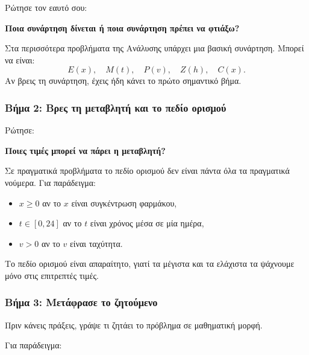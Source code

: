 Ρώτησε τον εαυτό σου:
\begin{center}
\textbf{Ποια συνάρτηση δίνεται ή ποια συνάρτηση πρέπει να φτιάξω?}
\end{center}
Στα περισσότερα προβλήματα της Ανάλυσης υπάρχει μια βασική συνάρτηση. Μπορεί να είναι:
\[
E(x),\quad M(t),\quad P(v),\quad Z(h),\quad C(x).
\]
Αν βρεις τη συνάρτηση, έχεις ήδη κάνει το πρώτο σημαντικό βήμα.

\subsubsection*{Βήμα 2: Βρες τη μεταβλητή και το πεδίο ορισμού}
Ρώτησε:
\begin{center}
\textbf{Ποιες τιμές μπορεί να πάρει η μεταβλητή?}
\end{center}
Σε πραγματικά προβλήματα το πεδίο ορισμού δεν είναι πάντα όλα τα πραγματικά νούμερα. Για παράδειγμα:
\begin{itemize}
\item $x\geq 0$ αν το \(x\) είναι συγκέντρωση φαρμάκου,
\item $t\in[0,24]$ αν το \(t\) είναι χρόνος μέσα σε μία ημέρα,
\item $v>0$ αν το \(v\) είναι ταχύτητα.
\end{itemize}

Το πεδίο ορισμού είναι απαραίτητο, γιατί τα μέγιστα και τα ελάχιστα τα ψάχνουμε μόνο στις επιτρεπτές τιμές.

\subsubsection*{Βήμα 3: Μετάφρασε το ζητούμενο}

Πριν κάνεις πράξεις, γράψε τι ζητάει το πρόβλημα σε μαθηματική μορφή.

Για παράδειγμα:
\begin{center}
\end{center}
